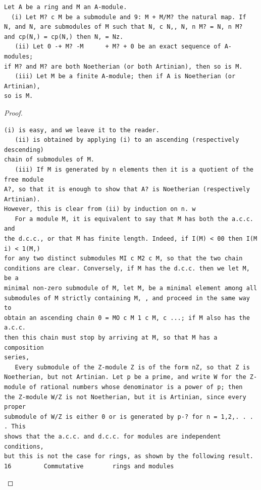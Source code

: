 \begin{theorem}\label{mcrt-auto-theorem-3-1}\uses{}
\begin{verbatim}
Let A be a ring and M an A-module.
  (i) Let M? c M be a submodule and 9: M + M/M? the natural map. If
N, and N, are submodules of M such that N, c N,, N, n M? = N, n M?
and cp(N,) = cp(N,) then N, = Nz.
   (ii) Let 0 -+ M? -M      + M? + 0 be an exact sequence of A-modules;
if M? and M? are both Noetherian (or both Artinian), then so is M.
   (iii) Let M be a finite A-module; then if A is Noetherian (or Artinian),
so is M.
\end{verbatim}
\end{theorem}
\begin{proof}
\begin{verbatim}
(i) is easy, and we leave it to the reader.
   (ii) is obtained by applying (i) to an ascending (respectively descending)
chain of submodules of M.
   (iii) If M is generated by n elements then it is a quotient of the free module
A?, so that it is enough to show that A? is Noetherian (respectively Artinian).
However, this is clear from (ii) by induction on n. w
   For a module M, it is equivalent to say that M has both the a.c.c. and
the d.c.c., or that M has finite length. Indeed, if I(M) < 00 then I(M i) < 1(M,)
for any two distinct submodules MI c M2 c M, so that the two chain
conditions are clear. Conversely, if M has the d.c.c. then we let M, be a
minimal non-zero submodule of M, let M, be a minimal element among all
submodules of M strictly containing M, , and proceed in the same way to
obtain an ascending chain 0 = MO c M 1 c M, c ...; if M also has the a.c.c.
then this chain must stop by arriving at M, so that M has a composition
series,
   Every submodule of the Z-module Z is of the form nZ, so that Z is
Noetherian, but not Artinian. Let p be a prime, and write W for the Z-
module of rational numbers whose denominator is a power of p; then
the Z-module W/Z is not Noetherian, but it is Artinian, since every proper
submodule of W/Z is either 0 or is generated by p-? for n = 1,2,. . . . This
shows that the a.c.c. and d.c.c. for modules are independent conditions,
but this is not the case for rings, as shown by the following result.
16         Commutative        rings and modules
\end{verbatim}
\end{proof}


